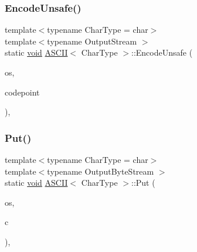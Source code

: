 \mbox{\label{structASCII_afeb90d6f04771067b83b35a0f366af46}} 
\subsubsection{\texorpdfstring{Encode\+Unsafe()}{EncodeUnsafe()}}
{\footnotesize\ttfamily template$<$typename Char\+Type  = char$>$ \\
template$<$typename Output\+Stream $>$ \\
static \hyperlink{imgui__impl__opengl3__loader_8h_ac668e7cffd9e2e9cfee428b9b2f34fa7}{void} \hyperlink{structASCII}{A\+S\+C\+II}$<$ Char\+Type $>$\+::Encode\+Unsafe (\begin{DoxyParamCaption}\item[{Output\+Stream \&}]{os,  }\item[{unsigned}]{codepoint }\end{DoxyParamCaption})\hspace{0.3cm}{\ttfamily [inline]}, {\ttfamily [static]}}

\mbox{\label{structASCII_a218b244b9cd961ea6c5775a734cec20e}} 
\subsubsection{\texorpdfstring{Put()}{Put()}}
{\footnotesize\ttfamily template$<$typename Char\+Type  = char$>$ \\
template$<$typename Output\+Byte\+Stream $>$ \\
static \hyperlink{imgui__impl__opengl3__loader_8h_ac668e7cffd9e2e9cfee428b9b2f34fa7}{void} \hyperlink{structASCII}{A\+S\+C\+II}$<$ Char\+Type $>$\+::Put (\begin{DoxyParamCaption}\item[{Output\+Byte\+Stream \&}]{os,  }\item[{\hyperlink{structASCII_a1baf6e7914f165be952c30db664cefb4}{Ch}}]{c }\end{DoxyParamCaption})\hspace{0.3cm}{\ttfamily [inline]}, {\ttfamily [static]}}

\mbox{\label{structASCII_a3036dc1d604039c3224ca0a890ee0134}} 
